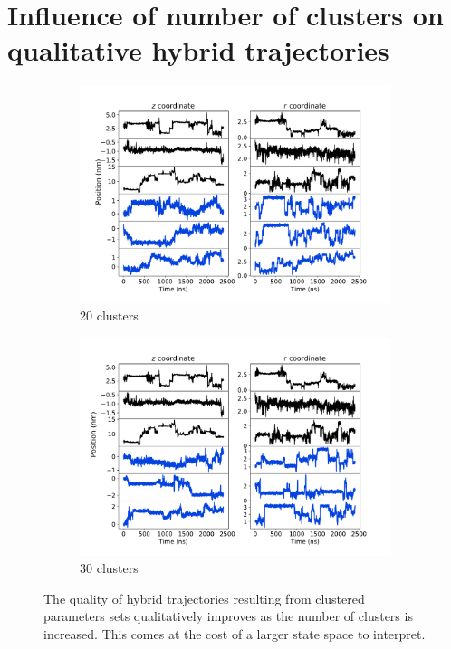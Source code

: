 \documentclass{article}
\begin{document}
  \section{Influence of number of clusters on qualitative hybrid trajectories}
  
  \begin{figure}
  \begin{subfigure}{0.48\textwidth}
  \includegraphics[width=\textwidth]{qualitative_clustered_MET_20.pdf}
  \caption{20 clusters}\label{fig:qualitative_20}
  \end{subfigure}
  \begin{subfigure}{0.48\textwidth}
  \includegraphics[width=\textwidth]{qualitative_clustered_MET_30.pdf}
  \caption{30 clusters}\label{fig:qualitative_30}
  \end{subfigure}
  \caption{The quality of hybrid trajectories resulting from clustered parameters
  sets qualitatively improves as the number of clusters is increased. This comes 
  at the cost of a larger state space to interpret.}\label{fig:qualitative_improvement}
  \end{figure}
  
\end{document}

